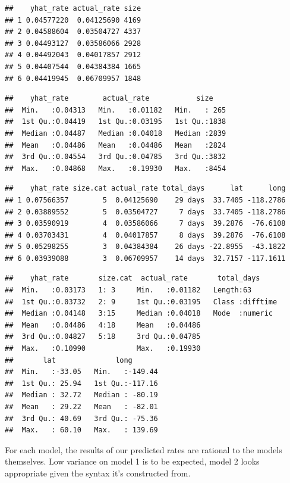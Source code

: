 \documentclass[
  11,
]{book}
\begin{document}
\begin{verbatim}
##    yhat_rate actual_rate size
## 1 0.04577220  0.04125690 4169
## 2 0.04588604  0.03504727 4337
## 3 0.04493127  0.03586066 2928
## 4 0.04492043  0.04017857 2912
## 5 0.04407544  0.04384384 1665
## 6 0.04419945  0.06709957 1848
\end{verbatim}

\begin{verbatim}
##    yhat_rate        actual_rate           size     
##  Min.   :0.04313   Min.   :0.01182   Min.   : 265  
##  1st Qu.:0.04419   1st Qu.:0.03195   1st Qu.:1838  
##  Median :0.04487   Median :0.04018   Median :2839  
##  Mean   :0.04486   Mean   :0.04486   Mean   :2824  
##  3rd Qu.:0.04554   3rd Qu.:0.04785   3rd Qu.:3832  
##  Max.   :0.04868   Max.   :0.19930   Max.   :8454
\end{verbatim}

\begin{verbatim}
##    yhat_rate size.cat actual_rate total_days      lat      long
## 1 0.07566357        5  0.04125690    29 days  33.7405 -118.2786
## 2 0.03889552        5  0.03504727     7 days  33.7405 -118.2786
## 3 0.03590919        4  0.03586066     7 days  39.2876  -76.6108
## 4 0.03703431        4  0.04017857     8 days  39.2876  -76.6108
## 5 0.05298255        3  0.04384384    26 days -22.8955  -43.1822
## 6 0.03939088        3  0.06709957    14 days  32.7157 -117.1611
\end{verbatim}

\begin{verbatim}
##    yhat_rate       size.cat  actual_rate       total_days      
##  Min.   :0.03173   1: 3     Min.   :0.01182   Length:63        
##  1st Qu.:0.03732   2: 9     1st Qu.:0.03195   Class :difftime  
##  Median :0.04148   3:15     Median :0.04018   Mode  :numeric   
##  Mean   :0.04486   4:18     Mean   :0.04486                    
##  3rd Qu.:0.04827   5:18     3rd Qu.:0.04785                    
##  Max.   :0.10990            Max.   :0.19930                    
##       lat              long        
##  Min.   :-33.05   Min.   :-149.44  
##  1st Qu.: 25.94   1st Qu.:-117.16  
##  Median : 32.72   Median : -80.19  
##  Mean   : 29.22   Mean   : -82.01  
##  3rd Qu.: 40.69   3rd Qu.: -75.36  
##  Max.   : 60.10   Max.   : 139.69
\end{verbatim}

For each model, the results of our predicted rates are rational to the models themselves. Low variance on model 1 is to be expected, model 2 looks appropriate given the syntax it's constructed from.
\end{document}
